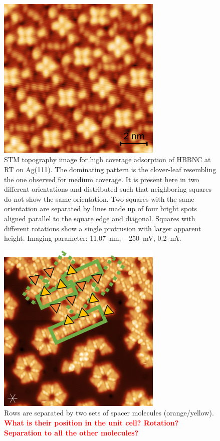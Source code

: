 \begin{figure}[] \centering
	\includegraphics[width=0.7\textwidth]{./images/A180515-095412}
	\caption{STM topography image for high coverage adsorption of HBBNC at RT on Ag(111). The dominating pattern is the clover-leaf resembling the one observed for medium coverage. It is present here in two different orientations and distributed such that neighboring squares do not show the same orientation. Two squares with the same orientation are separated by lines made up of four bright spots aligned parallel to the square edge and diagonal. Squares with different rotations show a single protrusion with larger apparent height. Imaging parameter: \SI{11.07}{\nano \meter}, \SI{-250}{\milli \volt}, \SI{0.2}{\nano \ampere}.}
	\label{fig:HBBNC-high-coverage}
\end{figure}

\begin{figure}[] \centering
	\includegraphics[width=0.7\textwidth]{./images/hbbnc-ag-111-rt-med-coverage-spacer-mol}
	\caption{Rows are separated by two sets of spacer molecules (orange/yellow). 
		\textcolor{red}{\textbf{What is their position in the unit cell? Rotation? Separation to all the other molecules?}}
	}
	\label{}
\end{figure}

